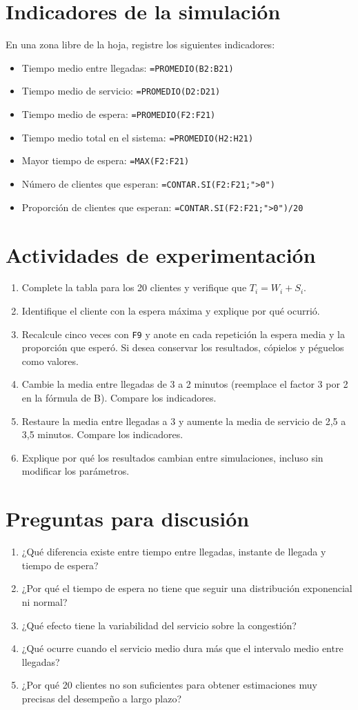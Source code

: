 \documentclass[11pt,a4paper]{article}
\begin{document}
\section{Indicadores de la simulación}
En una zona libre de la hoja, registre los siguientes indicadores:
\begin{itemize}[leftmargin=*]
\item Tiempo medio entre llegadas: \texttt{=PROMEDIO(B2:B21)}
\item Tiempo medio de servicio: \texttt{=PROMEDIO(D2:D21)}
\item Tiempo medio de espera: \texttt{=PROMEDIO(F2:F21)}
\item Tiempo medio total en el sistema: \texttt{=PROMEDIO(H2:H21)}
\item Mayor tiempo de espera: \texttt{=MAX(F2:F21)}
\item Número de clientes que esperan: \texttt{=CONTAR.SI(F2:F21;">0")}
\item Proporción de clientes que esperan: \texttt{=CONTAR.SI(F2:F21;">0")/20}
\end{itemize}
\section{Actividades de experimentación}
\begin{enumerate}[leftmargin=*]
\item Complete la tabla para los 20 clientes y verifique que $T_i=W_i+S_i$.
\item Identifique el cliente con la espera máxima y explique por qué ocurrió.
\item Recalcule cinco veces con \texttt{F9} y anote en cada repetición la espera media y la proporción que esperó. Si desea conservar los resultados, cópielos y péguelos como valores.
\item Cambie la media entre llegadas de 3 a 2 minutos (reemplace el factor 3 por 2 en la fórmula de B). Compare los indicadores.
\item Restaure la media entre llegadas a 3 y aumente la media de servicio de 2,5 a 3,5 minutos. Compare los indicadores.
\item Explique por qué los resultados cambian entre simulaciones, incluso sin modificar los parámetros.
\end{enumerate}
\section{Preguntas para discusión}
\begin{enumerate}[leftmargin=*]
\item ¿Qué diferencia existe entre tiempo entre llegadas, instante de llegada y tiempo de espera?
\item ¿Por qué el tiempo de espera no tiene que seguir una distribución exponencial ni normal?
\item ¿Qué efecto tiene la variabilidad del servicio sobre la congestión?
\item ¿Qué ocurre cuando el servicio medio dura más que el intervalo medio entre llegadas?
\item ¿Por qué 20 clientes no son suficientes para obtener estimaciones muy precisas del desempeño a largo plazo?
\end{enumerate}
\end{document}
